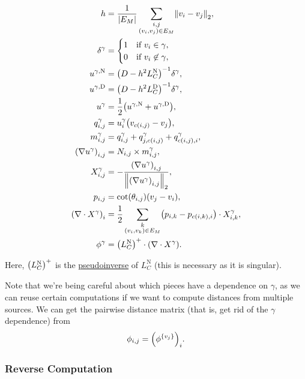 \begin{align*}
	h &= \frac{1}{\abs{E_M}}\sum_{\substack{i, j \\ \pof{v_i, v_j} \in E_M}}\norm{v_i - v_j}_2, \\
	\delta^\gamma &= \begin{cases}
		1 & \text{if \(v_i \in \gamma\)}, \\
		0 & \text{if \(v_i \not\in \gamma\)},
	\end{cases} \\
	u^{\gamma, \text{N}} &= \pof{D - h^2L_C^{\text{N}}}^{-1}\delta^\gamma, \\
	u^{\gamma, \text{D}} &= \pof{D - h^2L_C^{\text{D}}}^{-1}\delta^\gamma, \\
	u^\gamma &= \frac{1}{2}\pof{u^{\gamma, \text{N}} + u^{\gamma, \text{D}}}, \\
	q^\gamma_{i, j} &= u^\gamma_i\pof{v_{c\pof{i, j}} - v_j}, \\
	m^\gamma_{i, j} &= q^\gamma_{i, j} + q^\gamma_{j, c\pof{i, j}} + q^\gamma_{c\pof{i, j}, i}, \\
	\pof{\nabla u^\gamma}_{i, j} &= N_{i, j} \times m^\gamma_{i, j}, \\
	X^\gamma_{i, j} &= -\frac{\pof{\nabla u^\gamma}_{i, j}}{\norm{\pof{\nabla u^\gamma}_{i, j}}_2}, \\
	p_{i, j} &= \cot\pof{\theta_{i, j}}\pof{v_j - v_i}, \\
	\pof{\nabla \cdot X^\gamma}_i &= \frac{1}{2}\sum_{\substack{k \\ \pof{v_i, v_k} \in E_M}}\pof{p_{i, k} - p_{c\pof{i, k}, i}} \cdot X^\gamma_{i, k}, \\
	\phi^\gamma &= \pof{L_C^{\text{N}}}^+ \cdot \pof{\nabla \cdot X^\gamma}.
\end{align*}

Here, \(\pof{L_C^{\text{N}}}^+\) is the \href{https://en.wikipedia.org/wiki/Moore%E2%80%93Penrose_inverse}{pseudoinverse} of \(L_C^{\text{N}}\) (this is necessary as it is singular).

Note that we're being careful about which pieces have a dependence on \(\gamma\), as we can reuse certain computations if we want to compute distances from multiple sources. We can get the pairwise distance matrix (that is, get rid of the \(\gamma\) dependence) from \[\phi_{i, j} = \pof{\phi^{\cof{v_j}}}_i.\]

\subsubsection{Reverse Computation}


